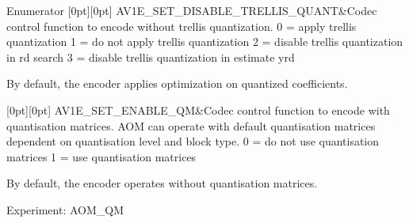 \begin{DoxyEnumFields}{Enumerator}
[0pt][0pt]{}\mbox{\label{group__aom__encoder_ggae78dde67a6d78f332e9bdba0dde42db5a374b5581d0b68d5f8cc3e3f73495cfbb}} 
A\+V1\+E\+\_\+\+S\+E\+T\+\_\+\+D\+I\+S\+A\+B\+L\+E\+\_\+\+T\+R\+E\+L\+L\+I\+S\+\_\+\+Q\+U\+A\+NT&Codec control function to encode without trellis quantization. 0 = apply trellis quantization 1 = do not apply trellis quantization 2 = disable trellis quantization in rd search 3 = disable trellis quantization in estimate yrd

By default, the encoder applies optimization on quantized coefficients. \\
\hline

[0pt][0pt]{}\mbox{\label{group__aom__encoder_ggae78dde67a6d78f332e9bdba0dde42db5ae63993934cdc5aa36efeec4df87a577e}} 
A\+V1\+E\+\_\+\+S\+E\+T\+\_\+\+E\+N\+A\+B\+L\+E\+\_\+\+QM&Codec control function to encode with quantisation matrices. A\+OM can operate with default quantisation matrices dependent on quantisation level and block type. 0 = do not use quantisation matrices 1 = use quantisation matrices

By default, the encoder operates without quantisation matrices.

Experiment\+: A\+O\+M\+\_\+\+QM \\
\hline


\end{DoxyEnumFields}
